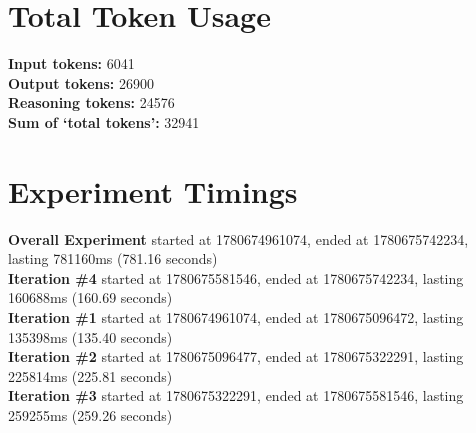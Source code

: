 \documentclass{article}
\begin{document}
\section*{Total Token Usage}
\textbf{Input tokens: }6041
\\\textbf{Output tokens: }26900
\\\textbf{Reasoning tokens: }24576
\\\textbf{Sum of `total tokens': }32941
\section*{Experiment Timings}
\textbf{Overall Experiment} started at 1780674961074, ended at 1780675742234, lasting 781160ms (781.16 seconds)
\\\textbf{Iteration \#4} started at 1780675581546, ended at 1780675742234, lasting 160688ms (160.69 seconds)
\\\textbf{Iteration \#1} started at 1780674961074, ended at 1780675096472, lasting 135398ms (135.40 seconds)
\\\textbf{Iteration \#2} started at 1780675096477, ended at 1780675322291, lasting 225814ms (225.81 seconds)
\\\textbf{Iteration \#3} started at 1780675322291, ended at 1780675581546, lasting 259255ms (259.26 seconds)
\end{document}
